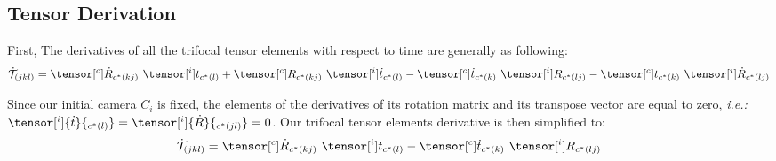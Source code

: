 \subsection{Tensor Derivation}
\label{sub:tensor_derivation}

First, The derivatives of all the trifocal tensor elements with respect to time are generally as following:
\begin{equation}
  \dot{\mathcal{T}}_{(jkl)} = \tensor[^{c}]{\dot{R}}{_{c^{*}(kj)}} \ \tensor[^{i}]{t}{_{c^{*}(l)}} + \tensor[^{c}]{R}{_{c^{*}(kj)}} \ \tensor[^{i}]{\dot{t}}{_{c^{*}(l)}} - \tensor[^{c}]{\dot{t}}{_{c^{*}(k)}} \ \tensor[^{i}]{R}{_{c^{*}(lj)}} - \tensor[^{c}]{t}{_{c^{*}(k)}} \ \tensor[^{i}]{\dot{R}}{_{c^{*}(lj)}} \label{eq:tensorderivatives1}
\end{equation}

Since our initial camera $C_i$ is fixed, the elements of the derivatives of its rotation matrix and its transpose vector are equal to zero, \textit{i.e.:} $\tensor[^i]{\dot{t}}{_{c^{*}(l)}} = \tensor[^i]{\dot{R}}{_{c^{*}(jl)}} = 0$. Our trifocal tensor elements derivative is then simplified to:
\begin{equation}
  \dot{\mathcal{T}}_{(jkl)} = \tensor[^{c}]{\dot{R}}{_{c^{*}(kj)}} \ \tensor[^{i}]{t}{_{c^{*}(l)}} - \tensor[^{c}]{\dot{t}}{_{c^{*}(k)}} \ \tensor[^{i}]{R}{_{c^{*}(lj)}} \label{eq:tensorderivatives2}
\end{equation}

